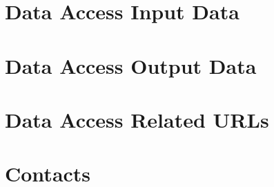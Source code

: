 \section{Data Access Input Data}
\DataAccessInputData

\section{Data Access Output Data}
\DataAccessOutputData

\section{Data Access Related URLs}
\DataAccessRelatedUrls

\section{Contacts}
\Contacts





  
